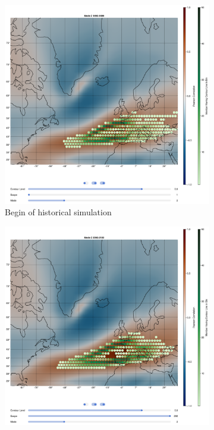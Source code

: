 \begin{figure}[!htb]
  \begin{subfigure}[b]{0.32\textwidth}
    \includegraphics[width=\textwidth]{figures/psl_ivt_cor_mode2_historical.png}
    \caption{Begin of historical simulation}
    \label{fig:psl eof ivt cor historical mode2}
  \end{subfigure}
  \hfill
  \begin{subfigure}[b]{0.32\textwidth}
    \includegraphics[width=\textwidth]{figures/psl_ivt_cor_mode2_ssp126.png}

\end{subfigure}
\end{figure}
